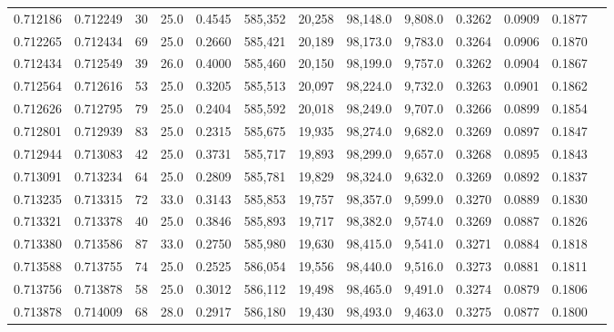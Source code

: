 \begin{tabular}{rrrrrrrrrrrrr}
0.712186 & 0.712249 &    30 & 25.0 &                                     0.4545 & 585,352 &  20,258 &  98,148.0 &   9,808.0 & 0.3262 & 0.0909 & 0.1877 \\
0.712265 & 0.712434 &    69 & 25.0 &                                     0.2660 & 585,421 &  20,189 &  98,173.0 &   9,783.0 & 0.3264 & 0.0906 & 0.1870 \\
0.712434 & 0.712549 &    39 & 26.0 &                                     0.4000 & 585,460 &  20,150 &  98,199.0 &   9,757.0 & 0.3262 & 0.0904 & 0.1867 \\
0.712564 & 0.712616 &    53 & 25.0 &                                     0.3205 & 585,513 &  20,097 &  98,224.0 &   9,732.0 & 0.3263 & 0.0901 & 0.1862 \\
0.712626 & 0.712795 &    79 & 25.0 &                                     0.2404 & 585,592 &  20,018 &  98,249.0 &   9,707.0 & 0.3266 & 0.0899 & 0.1854 \\
0.712801 & 0.712939 &    83 & 25.0 &                                     0.2315 & 585,675 &  19,935 &  98,274.0 &   9,682.0 & 0.3269 & 0.0897 & 0.1847 \\
0.712944 & 0.713083 &    42 & 25.0 &                                     0.3731 & 585,717 &  19,893 &  98,299.0 &   9,657.0 & 0.3268 & 0.0895 & 0.1843 \\
0.713091 & 0.713234 &    64 & 25.0 &                                     0.2809 & 585,781 &  19,829 &  98,324.0 &   9,632.0 & 0.3269 & 0.0892 & 0.1837 \\
0.713235 & 0.713315 &    72 & 33.0 &                                     0.3143 & 585,853 &  19,757 &  98,357.0 &   9,599.0 & 0.3270 & 0.0889 & 0.1830 \\
0.713321 & 0.713378 &    40 & 25.0 &                                     0.3846 & 585,893 &  19,717 &  98,382.0 &   9,574.0 & 0.3269 & 0.0887 & 0.1826 \\
0.713380 & 0.713586 &    87 & 33.0 &                                     0.2750 & 585,980 &  19,630 &  98,415.0 &   9,541.0 & 0.3271 & 0.0884 & 0.1818 \\
0.713588 & 0.713755 &    74 & 25.0 &                                     0.2525 & 586,054 &  19,556 &  98,440.0 &   9,516.0 & 0.3273 & 0.0881 & 0.1811 \\
0.713756 & 0.713878 &    58 & 25.0 &                                     0.3012 & 586,112 &  19,498 &  98,465.0 &   9,491.0 & 0.3274 & 0.0879 & 0.1806 \\
0.713878 & 0.714009 &    68 & 28.0 &                                     0.2917 & 586,180 &  19,430 &  98,493.0 &   9,463.0 & 0.3275 & 0.0877 & 0.1800 \\

\end{tabular}
